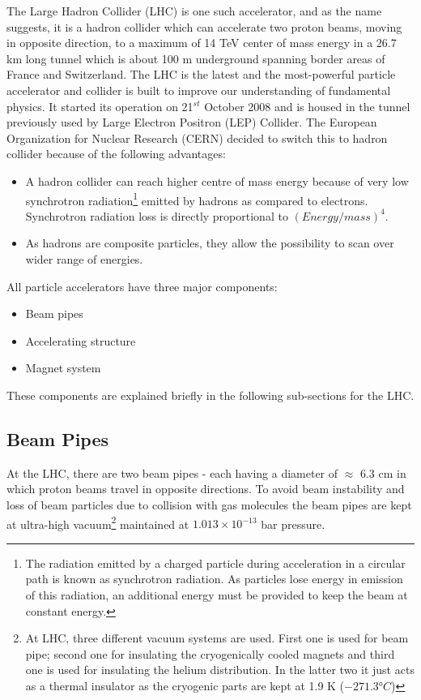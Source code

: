 The Large Hadron Collider (LHC) is one such accelerator, and as the name suggests, it is  a hadron collider which can accelerate two proton beams, moving in opposite direction, to a maximum of 14 TeV center of mass energy in a 26.7 km long tunnel which is about 100 m underground spanning border areas of France and Switzerland. The LHC is the latest and the most-powerful particle accelerator and collider is built to improve our understanding of fundamental physics. It started its operation on 21$^{st}$ October 2008 and is housed in the tunnel previously used by Large Electron Positron (LEP) Collider. The European Organization for Nuclear Research (CERN) decided to switch this to hadron collider because of the following advantages:
\begin{itemize}
    \item A hadron collider can reach higher centre of mass energy because of very low synchrotron radiation\footnote{The radiation emitted by a charged particle during acceleration in a circular path is known as synchrotron radiation. As particles lose energy in emission of this radiation, an additional energy must be provided to keep the beam at constant energy.} emitted by hadrons as compared to electrons. Synchrotron radiation loss is directly proportional to $(Energy/mass)^4$.
    \item As hadrons are composite particles, they allow the possibility to scan over wider range of energies.
\end{itemize}
All particle accelerators have three major components:
\begin{itemize}
  \item Beam pipes
  \item Accelerating structure
  \item Magnet system
\end{itemize}
These components are explained briefly in the following sub-sections for the LHC.

\subsection{Beam Pipes} %
\label{sub:beam_pipes}

At the LHC, there are two beam pipes - each having a diameter of $\approx$ 6.3 cm in which proton beams travel in opposite directions. To avoid beam instability and loss of beam particles due to collision with gas molecules the beam pipes are kept at ultra-high vacuum\footnote{At LHC, three different vacuum systems are used. First one is used for beam pipe; second one for insulating the cryogenically cooled magnets and third one is used for insulating the helium distribution. In the latter two it just acts as a thermal insulator as the cryogenic parts are kept at 1.9 K ($\ang{-271.3}C$)} maintained at $1.013 \times 10^{-13}$ bar pressure.

